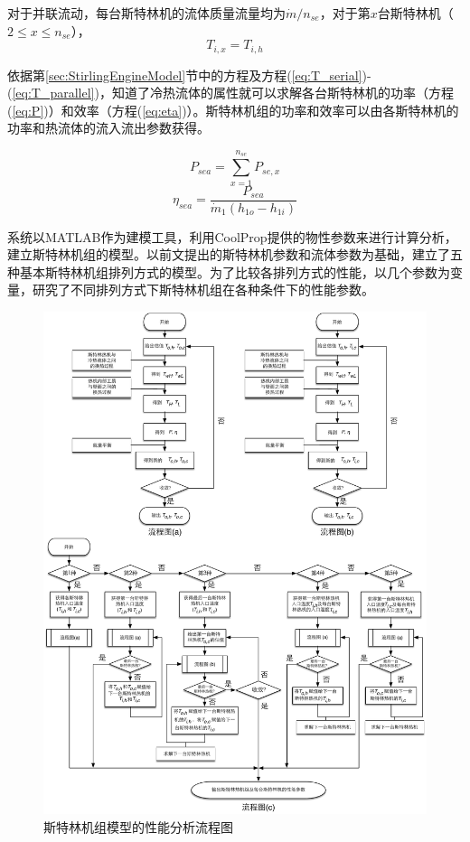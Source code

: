 对于并联流动，每台斯特林机的流体质量流量均为$\dot{m}/n_{se}$，对于第$x$台斯特林机（$2\leqslant{}x\leqslant{}n_{se}$），
\begin{equation}
	T_{i,x} = T_{i,h}
	\label{eq:T_parallel}
\end{equation}

依据第\ref{sec:StirlingEngineModel}节中的方程及方程(\ref{eq:T_serial})-(\ref{eq:T_parallel})，知道了冷热流体的属性就可以求解各台斯特林机的功率（方程(\ref{eq:P})）和效率（方程(\ref{eq:eta})）。斯特林机组的功率和效率可以由各斯特林机的功率和热流体的流入流出参数获得。

\begin{equation}
	P_{sea} = \sum_{x = 1}^{n_{se}}P_{se,x}
\end{equation}
\begin{equation}
	\eta_{sea} = \dfrac{P_{sea}}{\dot{m}_1(h_{1o} - h_{1i})}
\end{equation}

系统以MATLAB作为建模工具，利用CoolProp提供的物性参数来进行计算分析，建立斯特林机组的模型。以前文提出的斯特林机参数和流体参数为基础，建立了五种基本斯特林机组排列方式的模型。为了比较各排列方式的性能，以几个参数为变量，研究了不同排列方式下斯特林机组在各种条件下的性能参数。

\noindent \begin{figure}[htbp]
\begin{center}
	\includegraphics[width = 1.0\columnwidth]{fig/FlowChart}
	\caption{斯特林机组模型的性能分析流程图}
	\label{fig:Flowchart}
\end{center}
\end{figure}

